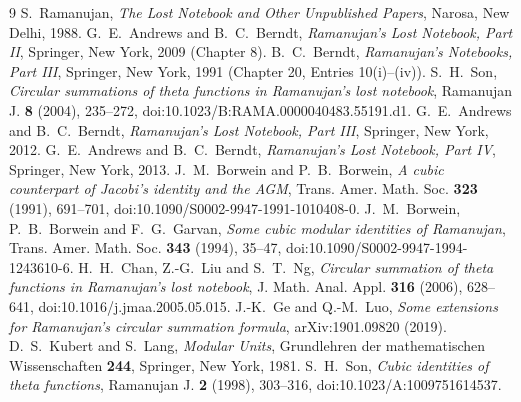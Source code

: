 \documentclass[pdflatex,sn-mathphys-num]{sn-jnl}
\theoremstyle{thmstyleone}%
\theoremstyle{thmstyletwo}%
\begin{document}
\begin{thebibliography}{9}
 S.~Ramanujan, \emph{The Lost Notebook and Other Unpublished Papers}, Narosa, New Delhi, 1988.
 G.~E.~Andrews and B.~C.~Berndt, \emph{Ramanujan's Lost Notebook, Part II}, Springer, New York, 2009 (Chapter 8).
 B.~C.~Berndt, \emph{Ramanujan's Notebooks, Part III}, Springer, New York, 1991 (Chapter 20, Entries 10(i)--(iv)).
 S.~H.~Son, \emph{Circular summations of theta functions in Ramanujan's lost notebook}, Ramanujan J. \textbf{8} (2004), 235--272, doi:10.1023/B:RAMA.0000040483.55191.d1.
 G.~E.~Andrews and B.~C.~Berndt, \emph{Ramanujan's Lost Notebook, Part III}, Springer, New York, 2012.
 G.~E.~Andrews and B.~C.~Berndt, \emph{Ramanujan's Lost Notebook, Part IV}, Springer, New York, 2013.
 J.~M.~Borwein and P.~B.~Borwein, \emph{A cubic counterpart of Jacobi's identity and the AGM}, Trans. Amer. Math. Soc. \textbf{323} (1991), 691--701, doi:10.1090/S0002-9947-1991-1010408-0.
 J.~M.~Borwein, P.~B.~Borwein and F.~G.~Garvan, \emph{Some cubic modular identities of Ramanujan}, Trans. Amer. Math. Soc. \textbf{343} (1994), 35--47, doi:10.1090/S0002-9947-1994-1243610-6.
 H.~H.~Chan, Z.-G.~Liu and S.~T.~Ng, \emph{Circular summation of theta functions in Ramanujan's lost notebook}, J. Math. Anal. Appl. \textbf{316} (2006), 628--641, doi:10.1016/j.jmaa.2005.05.015.
 J.-K.~Ge and Q.-M.~Luo, \emph{Some extensions for Ramanujan's circular summation formula}, arXiv:1901.09820 (2019).
 D.~S.~Kubert and S.~Lang, \emph{Modular Units}, Grundlehren der mathematischen Wissenschaften \textbf{244}, Springer, New York, 1981.
 S.~H.~Son, \emph{Cubic identities of theta functions}, Ramanujan J. \textbf{2} (1998), 303--316, doi:10.1023/A:1009751614537.
\end{thebibliography}
\end{document}
